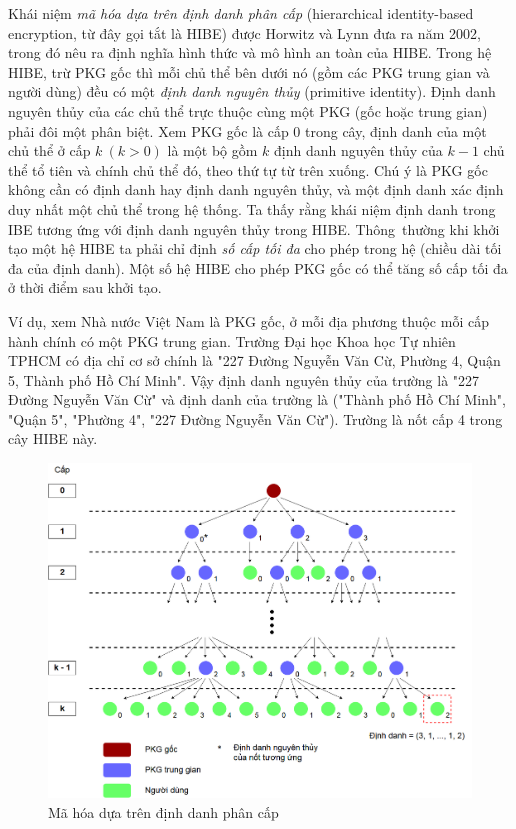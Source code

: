 \documentclass[class=report, crop=false]{standalone}
\begin{document}
		Khái niệm \textit{mã hóa dựa trên định danh phân cấp} (hierarchical identity-based encryption, từ đây gọi tắt là HIBE) được Horwitz và Lynn \cite{DBLP:conf/eurocrypt/HorwitzL02} đưa ra năm 2002, trong đó nêu ra định nghĩa hình thức và mô hình an toàn của HIBE. Trong hệ HIBE, trừ PKG gốc thì mỗi chủ thể bên dưới nó (gồm các PKG trung gian và người dùng) đều có một \textit{định danh nguyên thủy} (primitive identity). Định danh nguyên thủy của các chủ thể trực thuộc cùng một PKG (gốc hoặc trung gian) phải đôi một phân biệt. Xem PKG gốc là cấp $0$ trong cây, định danh của một chủ thể ở cấp $k \ (k > 0)$ là một bộ gồm $k$ định danh nguyên thủy của $k - 1$ chủ thể tổ tiên và chính chủ thể đó, theo thứ tự từ trên xuống. Chú ý là PKG gốc không cần có định danh hay định danh nguyên thủy, và một định danh xác định duy nhất một chủ thể trong hệ thống. Ta thấy rằng khái niệm định danh trong IBE tương ứng với định danh nguyên thủy trong HIBE. Thông~thường khi khởi tạo một hệ HIBE ta phải chỉ định \textit{số cấp tối đa} cho phép trong hệ (chiều dài tối đa của định danh). Một số hệ HIBE cho phép PKG gốc có thể tăng số cấp tối đa ở thời điểm sau khởi tạo.
		
		Ví dụ, xem Nhà nước Việt Nam là PKG gốc, ở mỗi địa phương thuộc mỗi cấp hành chính có một PKG trung gian. Trường Đại học Khoa học Tự nhiên TPHCM có địa chỉ cơ sở chính là "227 Đường Nguyễn Văn Cừ, Phường 4, Quận 5, Thành phố Hồ Chí Minh". Vậy định danh nguyên thủy của trường là "227 Đường Nguyễn Văn Cừ" và định danh của trường là ("Thành phố Hồ Chí Minh", "Quận 5", "Phường 4", "227 Đường Nguyễn Văn Cừ"). Trường là nốt cấp 4 trong cây HIBE này.
		\begin{figure}[h]
			\captionsetup{font=normalsize}
			\includegraphics[width=\textwidth]{hibe_visualization.png}
			\centering
			\caption{Mã hóa dựa trên định danh phân cấp}
		\end{figure}
\end{document}
